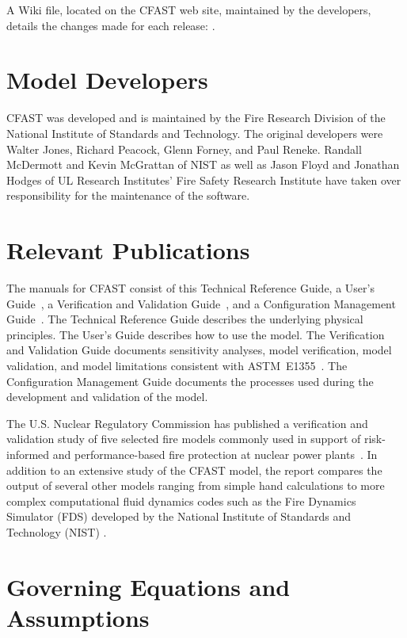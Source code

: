 A Wiki file, located on the CFAST web site, maintained by the developers, details the changes made for each release: \href{https://github.com/firemodels/cfast/wiki/Release-Notes}{}.


\section{Model Developers}

CFAST was developed and is maintained by the Fire Research Division of the National Institute of Standards and Technology. The original developers were Walter Jones,  Richard Peacock, Glenn Forney, and Paul Reneke. Randall McDermott and Kevin McGrattan of NIST as well as Jason Floyd and Jonathan Hodges of UL Research Institutes' Fire Safety Research Institute have taken over responsibility for the maintenance of the software.

\section{Relevant Publications}

The manuals for CFAST consist of this Technical Reference Guide, a User's Guide~\cite{CFAST_Users_Guide_8}, a Verification and Validation Guide~\cite{CFAST_Valid_Guide_8}, and a Configuration Management Guide~\cite{CFAST_Config_Guide_8}.  The Technical Reference Guide describes the underlying physical principles. The User's Guide describes how to use the model. The Verification and Validation Guide documents sensitivity analyses, model verification, model validation, and model limitations consistent with ASTM~E1355~\cite{CFAST:ASTM:E1355}. The Configuration Management Guide documents the processes used during the development and validation of the model.

The U.S. Nuclear Regulatory Commission has published a verification and validation study of five selected fire models commonly used in support of risk-informed and performance-based fire protection at nuclear power plants~\cite{NRCNUREG1824}. In addition to an extensive study of the CFAST model, the report compares the output of several other models ranging from simple hand calculations to more complex computational fluid dynamics codes such as the Fire Dynamics Simulator (FDS) developed by the National Institute of Standards and Technology (NIST) \cite{FDS_Tech_Guide_6}.


\section{Governing Equations and Assumptions}

